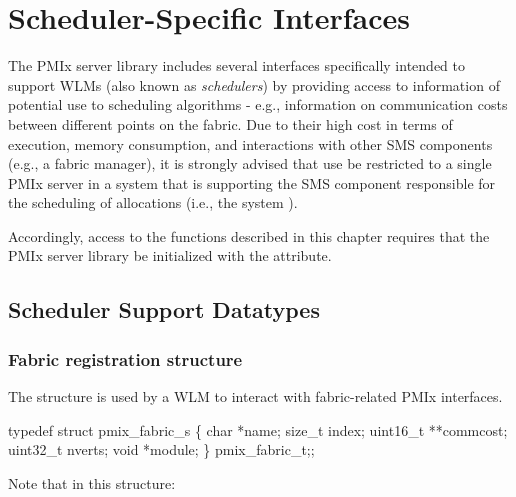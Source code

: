 \chapter{Scheduler-Specific Interfaces}
\label{chap:api_scheduler}

The \ac{PMIx} server library includes several interfaces specifically intended to support \acp{WLM} (also known as \emph{schedulers}) by providing access to information of potential use to scheduling algorithms - e.g., information on communication costs between different points on the fabric. Due to their high cost in terms of execution, memory consumption, and interactions with other \ac{SMS} components (e.g., a fabric manager), it is strongly advised that use be restricted to a single \ac{PMIx} server in a system that is supporting the \ac{SMS} component responsible for the scheduling of allocations (i.e., the system ).

Accordingly, access to the functions described in this chapter requires that the \ac{PMIx} server library be initialized with the  attribute.

\section{Scheduler Support Datatypes}

\subsection{Fabric registration structure}

The  structure is used by a \ac{WLM} to interact with fabric-related \ac{PMIx} interfaces.

\cspecificstart
\begin{codepar}
typedef struct pmix_fabric_s \{
    char *name;
    size_t index;
    uint16_t **commcost;
    uint32_t nverts;
    void *module;
\} pmix_fabric_t;;
\end{codepar}
\cspecificend

Note that in this structure:

